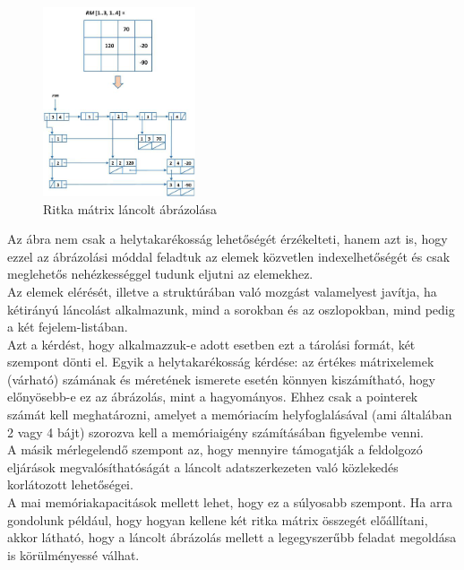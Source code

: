 \documentclass[12pt,margin=0px]{article}
\begin{document}
	\begin{figure}[H]
		\centering
		\includegraphics[width=0.4\textwidth]{img/array_linked_list.png}
		\caption{Ritka mátrix láncolt ábrázolása}
        \label{fig:array_linked_list}
	\end{figure}

    \noindent Az ábra nem csak a helytakarékosság lehetőségét érzékelteti, hanem azt is, hogy ezzel az ábrázolási móddal feladtuk az elemek közvetlen indexelhetőségét és csak meglehetős nehézkességgel tudunk eljutni az elemekhez.\\

    \noindent Az elemek elérését, illetve a struktúrában való mozgást valamelyest javítja, ha kétirányú láncolást alkalmazunk, mind a sorokban és az oszlopokban, mind pedig a két fejelem-listában.\\

    \noindent Azt a kérdést, hogy alkalmazzuk-e adott esetben ezt a tárolási formát, két szempont dönti el. Egyik a helytakarékosság kérdése: az értékes mátrixelemek (várható) számának és méretének ismerete esetén könnyen kiszámítható, hogy előnyösebb-e ez az ábrázolás, mint a hagyományos. Ehhez csak a pointerek számát kell meghatározni, amelyet a memóriacím helyfoglalásával (ami általában 2 vagy 4 bájt) szorozva kell a memóriaigény számításában figyelembe venni.\\

    \noindent A másik mérlegelendő szempont az, hogy mennyire támogatják a feldolgozó eljárások megvalósíthatóságát a láncolt adatszerkezeten való közlekedés korlátozott lehetőségei. \\
    A mai memóriakapacitások mellett lehet, hogy ez a súlyosabb szempont. Ha arra gondolunk például, hogy hogyan kellene két ritka mátrix összegét előállítani, akkor látható, hogy a láncolt ábrázolás mellett a legegyszerűbb feladat megoldása is körülményessé válhat.\\
\end{document}
